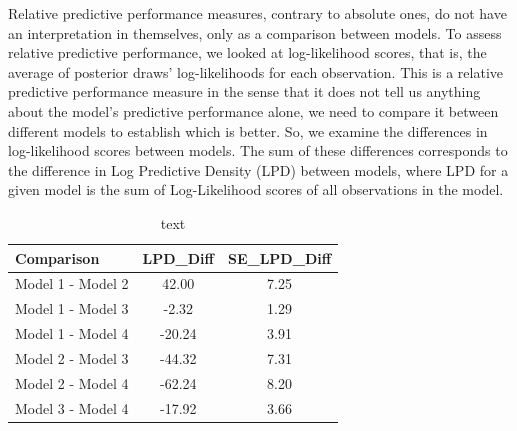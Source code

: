 \documentclass[12pt]{article}
\newcommand{\red}[1]{\textcolor{red}{#1}}
\newcommand{\blue}[1]{\textcolor{blue}{#1}}
\begin{document}
%
%






Relative predictive performance measures, contrary to absolute ones, do not have an interpretation in themselves, only as a comparison between models. 
To assess relative predictive performance, we looked at log-likelihood scores, that is, the average of posterior draws' log-likelihoods for each observation.
This is a relative predictive performance measure in the sense that it does not tell us anything about the model's predictive performance alone, we need to compare it between different models to establish which is better. So, we examine the differences in log-likelihood scores between models.
The sum of these differences corresponds to the difference in Log Predictive Density (LPD) between models, where LPD for a given model is the sum of Log-Likelihood scores of all observations in the model.




\begin{table}[ht]
	\centering
	\begin{tabular}{lcc}
		\hline
		       Comparison & LPD\_Diff & SE\_LPD\_Diff \\ 
		       \midrule
		Model 1 - Model 2 &     42.00 &          7.25 \\
		Model 1 - Model 3 &     -2.32 &          1.29 \\
		Model 1 - Model 4 &    -20.24 &          3.91 \\
		Model 2 - Model 3 &    -44.32 &          7.31 \\
		Model 2 - Model 4 &    -62.24 &          8.20 \\
		Model 3 - Model 4 &    -17.92 &          3.66 \\ \hline
	\end{tabular}
	\caption{text}
	\label{tab:LPD_diff}
\end{table}
\end{document}
